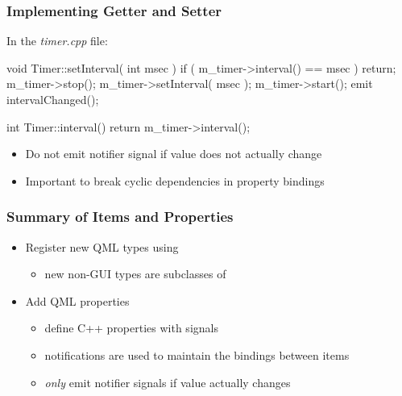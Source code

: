
\begin{slide}[fragile]\frametitle{Implementing Getter and Setter}

In the \textit{timer.cpp} file:
\vspace*{0.25em}
\begin{cpp}
void Timer::setInterval( int msec )
{
    if ( m_timer->interval() == msec )
        return;
    m_timer->stop();
    m_timer->setInterval( msec );
    m_timer->start();
    emit intervalChanged();
}

int Timer::interval()
{
    return m_timer->interval();
}
\end{cpp}

\begin{itemize}
\item Do not emit notifier signal if value does not actually change
\item Important to break cyclic dependencies in property bindings
\end{itemize}

\end{slide}



\begin{slide}\frametitle{Summary of Items and Properties}

\begin{itemize}
\item Register new QML types using 
  \begin{itemize}
  \item new non-GUI types are subclasses of 
  \end{itemize}
\vspace*{0.5em}
\item Add QML properties
  \begin{itemize}
  \item define C++ properties with  signals
  \item notifications are used to maintain the bindings between items
  \item \emph{only} emit notifier signals if value actually changes
  \end{itemize}
\end{itemize}

\end{slide} 





